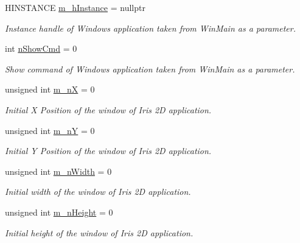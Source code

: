 \begin{DoxyCompactItemize}
\item 
H\+I\+N\+S\+T\+A\+N\+CE \hyperlink{struct_iris2_d_1_1_iris_application_1_1_iris_app_start_info_ab52c3d4447fe5c14dbd0f6839dd05032}{m\+\_\+h\+Instance} = nullptr
\begin{DoxyCompactList}\small\item\em Instance handle of Windows application taken from Win\+Main as a parameter. \end{DoxyCompactList}\item 
int \hyperlink{struct_iris2_d_1_1_iris_application_1_1_iris_app_start_info_a45353664bb0d0719cb06eb7763263d7d}{n\+Show\+Cmd} = 0
\begin{DoxyCompactList}\small\item\em Show command of Windows application taken from Win\+Main as a parameter. \end{DoxyCompactList}\item 
unsigned int \hyperlink{struct_iris2_d_1_1_iris_application_1_1_iris_app_start_info_af28e48cc9ed52f3e6ed6e9e5c464f6b7}{m\+\_\+nX} = 0
\begin{DoxyCompactList}\small\item\em Initial X Position of the window of Iris 2D application. \end{DoxyCompactList}\item 
unsigned int \hyperlink{struct_iris2_d_1_1_iris_application_1_1_iris_app_start_info_a451b1ba8aedbae08e32ecc379307ca93}{m\+\_\+nY} = 0
\begin{DoxyCompactList}\small\item\em Initial Y Position of the window of Iris 2D application. \end{DoxyCompactList}\item 
unsigned int \hyperlink{struct_iris2_d_1_1_iris_application_1_1_iris_app_start_info_a6bc24eb8432766a73244dfa4dbebab2b}{m\+\_\+n\+Width} = 0
\begin{DoxyCompactList}\small\item\em Initial width of the window of Iris 2D application. \end{DoxyCompactList}\item 
unsigned int \hyperlink{struct_iris2_d_1_1_iris_application_1_1_iris_app_start_info_a05180868d302caaeed1ea93b9443be3b}{m\+\_\+n\+Height} = 0
\begin{DoxyCompactList}\small\item\em Initial height of the window of Iris 2D application. \end{DoxyCompactList}\item 

\end{DoxyCompactItemize}
